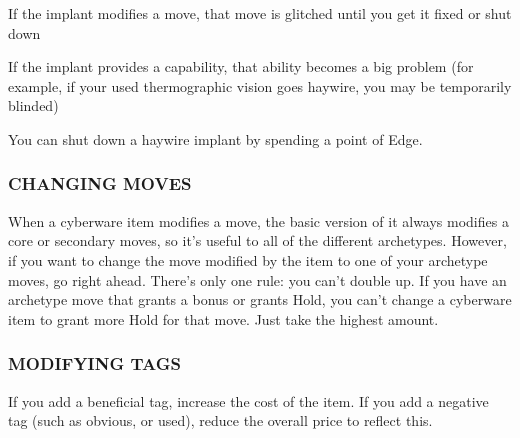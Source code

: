 \documentclass[oneside,10pt]{article}
\begin{document}
\begin{multicols}{2}
\begin{adjustwidth*}{.5cm}{.5cm}
\begin{adjustwidth*}{.5cm}{.5cm}
\tcirc{} If the implant modifies a move, that move is glitched
until you get it fixed or shut down

\tcirc{} If the implant provides a capability, that ability becomes
a big problem (for example, if your used thermographic
vision goes haywire, you may be temporarily blinded)

\tcirc{} You can shut down a haywire implant by spending a
point of Edge.
\end{adjustwidth*}
\end{adjustwidth*}
\subsubsection{CHANGING MOVES}
When a cyberware item modifies a move, the basic version of
it always modifies a core or secondary moves, so it’s useful
to all of the different archetypes. However, if you want to
change the move modified by the item to one of your archetype moves, go right ahead. There’s only one rule: you can’t
double up. If you have an archetype move that grants a bonus
or grants Hold, you can’t change a cyberware item to grant
more Hold for that move. Just take the highest amount.

\subsubsection{MODIFYING TAGS}
If you add a beneficial tag, increase the cost of the item. If
you add a negative tag (such as obvious, or used), reduce the
overall price to reflect this.

\end{multicols}

\end{document}
